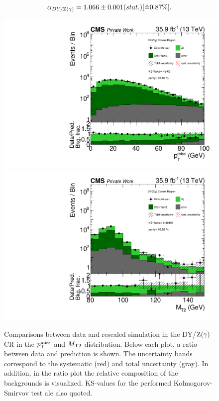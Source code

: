 %
\begin{equation}\label{eq:AlphaDY}
 \alpha_{DY/\mathrm{Z}(\gamma)}=1.066 \pm 0.001 (stat.) [\hat{=}0.87\%].
\end{equation}

\begin{figure}[tbp]
 \centering
 \includegraphics[width=\pairwidth]{figures/plots_CR_dy/CRDY_LL_nom_met_log}
 \includegraphics[width=\pairwidth]{figures/plots_CR_dy/CRDY_LL_nom_mt2_log}
 \caption{Comparisons between data and rescaled simulation in the DY/$\mathrm{Z}(\gamma)$ CR in the $p_{\mathrm{T}}^\text{miss}$ and $M_{\mathrm{T2}}$ distribution. Below each plot, a ratio between data and prediction is shown. The uncertainty bands correspond to the systematic (red) and total uncertainty (gray). In addition, in the ratio plot the relative composition of the backgrounds is visualized. KS-values for the performed Kolmogorov-Smirvov test ale also quoted.}
 \label{fig:CRDY}
\end{figure}
